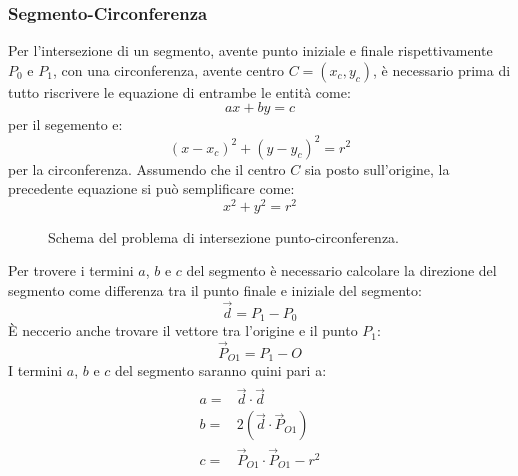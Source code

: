 \subsubsection{Segmento-Circonferenza}
Per l'intersezione di un segmento, avente punto iniziale e finale rispettivamente $P_0$ e $P_1$, con una circonferenza, avente centro $C=(x_c,y_c)$, è necessario prima di tutto riscrivere le equazione di entrambe le entità come:
\begin{equation}
ax+by=c
\label{eqretta}
\end{equation}
per il segemento e:
\begin{equation}
(x-x_c)^2 + (y-y_c)^2 = r^2
\end{equation}
per la circonferenza. Assumendo che il centro $C$ sia posto sull'origine, la precedente equazione si può semplificare come:
\begin{equation}
x^2 + y^2 = r^2
\label{eqcircle}
\end{equation}
\begin{figure}[h]
	\centering
	\caption{Schema del problema di intersezione punto-circonferenza.}
\end{figure}
Per trovere i termini $a$, $b$ e $c$ del segmento è necessario calcolare la direzione del segmento come differenza tra il punto finale e iniziale del segmento:
\begin{equation}
\vec{d} = P_1 - P_0 
\end{equation}
È neccerio anche trovare il vettore tra l'origine e il punto $P_1$:
\begin{equation}
\vec{P}_{O1} = P_1 - O
\end{equation}
I termini $a$, $b$ e $c$ del segmento saranno quini pari a:
\begin{equation}
\begin{aligned}
	\begin{split}
		a =& \vec{d} \cdot \vec{d} \\
		b =& 2 (\vec{d} \cdot \vec{P}_{O1}) \\
		c =& \vec{P}_{O1} \cdot \vec{P}_{O1} - r^2
	\end{split}
\end{aligned}
\end{equation}

